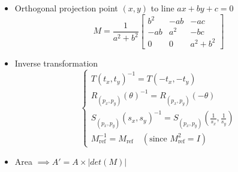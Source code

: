 \begin{itemize}
    \item Orthogonal projection point $(x, y)$ to line $ax+by+c = 0$
    \[
        M = \frac{1}{a^2 + b^2}
        \begin{bmatrix}
            b^2 & -ab & -ac \\
            -ab & a^2 & -bc \\
            0 & 0 & a^2 + b^2
        \end{bmatrix}
    \]

    \item Inverse transformation
    \[
        \begin{cases}
            T(t_x, t_y)^{-1} = T(-t_x, -t_y) \\
            R_{(p_x, p_y)}(\theta)^{-1} = R_{(p_x, p_y)}(-\theta) \\
            S_{(p_x, p_y)}(s_x, s_y)^{-1} = S_{(p_x, p_y)}\left(\frac{1}{s_x}, \frac{1}{s_y}\right) \\
            M_{\text{ref}}^{-1} = M_{\text{ref}} \quad (\text{since } M_{\text{ref}}^2 = I)
        \end{cases}
    \]

    \item Area $\implies A' = A \times |det(M)|$
\end{itemize}